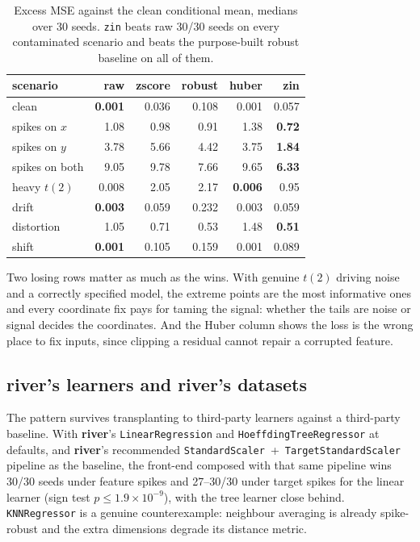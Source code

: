 \documentclass[article]{jss}
\providecommand{\pkg}[1]{\textbf{#1}}
\providecommand{\code}[1]{\texttt{#1}}
\theoremstyle{remark}
\begin{document}
\begin{table}[t]
\centering
\begin{tabular}{lrrrrr}
\toprule
scenario & raw & zscore & robust & huber & zin \\
\midrule
clean          & \textbf{0.001} & 0.036 & 0.108 & 0.001 & 0.057 \\
spikes on $x$  & 1.08 & 0.98 & 0.91 & 1.38 & \textbf{0.72} \\
spikes on $y$  & 3.78 & 5.66 & 4.42 & 3.75 & \textbf{1.84} \\
spikes on both & 9.05 & 9.78 & 7.66 & 9.65 & \textbf{6.33} \\
heavy $t(2)$   & 0.008 & 2.05 & 2.17 & \textbf{0.006} & 0.95 \\
drift          & \textbf{0.003} & 0.059 & 0.232 & 0.003 & 0.059 \\
distortion     & 1.05 & 0.71 & 0.53 & 1.48 & \textbf{0.51} \\
shift          & \textbf{0.001} & 0.105 & 0.159 & 0.001 & 0.089 \\
\bottomrule
\end{tabular}
\caption{Excess MSE against the clean conditional mean, medians over 30
seeds. \code{zin} beats raw 30/30 seeds on every contaminated scenario and
beats the purpose-built robust baseline on all of them.}
\label{tab:sim}
\end{table}

Two losing rows matter as much as the wins. With genuine $t(2)$ driving noise
and a correctly specified model, the extreme points are the most informative
ones and every coordinate fix pays for taming the signal: whether the tails
are noise or signal decides the coordinates. And the Huber column shows the
loss is the wrong place to fix inputs, since clipping a residual cannot
repair a corrupted feature.

\subsection[river's learners and river's datasets]{\pkg{river}'s learners and \pkg{river}'s datasets}

The pattern survives transplanting to third-party learners against a
third-party baseline. With \pkg{river}'s \code{LinearRegression} and
\code{HoeffdingTreeRegressor} at defaults, and \pkg{river}'s recommended
\code{StandardScaler}~+~\code{TargetStandardScaler} pipeline as the baseline,
the front-end composed with that same pipeline wins 30/30 seeds under
feature spikes and 27--30/30 under target spikes for the linear learner (sign
test $p \le 1.9\times10^{-9}$), with the tree learner close behind.
\code{KNNRegressor} is a genuine counterexample: neighbour averaging is
already spike-robust and the extra dimensions degrade its distance metric.
\end{document}
